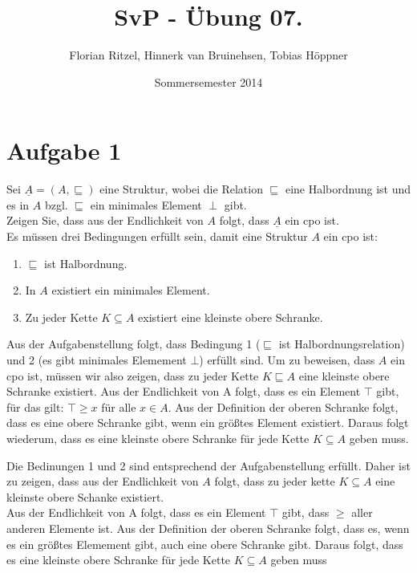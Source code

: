 \documentclass[ngerman,a4paper]{report}
\author{Florian Ritzel, Hinnerk van Bruinehsen, Tobias Höppner}
\title{SvP - Übung 07. }
\date{Sommersemester 2014}
\renewcommand{\maketitle}{}
\begin{document}
\maketitle
\section*{Aufgabe 1}
Sei $\underline{A} = (A,\sqsubseteq)$ eine Struktur, wobei die Relation $\sqsubseteq$ eine Halbordnung ist und es in $A$ bzgl. $\sqsubseteq$ ein minimales Element $\perp$ gibt.\\
Zeigen Sie, dass aus der Endlichkeit von $A$ folgt, dass $\underline{A}$ ein cpo ist.\\

Es müssen drei Bedingungen erfüllt sein, damit eine Struktur $A$ ein cpo ist:
\begin{enumerate}
\item $\sqsubseteq$ ist Halbordnung.
\item In $A$ existiert ein minimales Element.
\item Zu jeder Kette $K\subseteq A$ existiert eine kleinste obere Schranke.
\end{enumerate}
Aus der Aufgabenstellung folgt, dass Bedingung 1 ($\sqsubseteq$ ist Halbordnungsrelation) und 2 (es gibt minimales Elemement $\bot$) erfüllt sind.
Um zu beweisen, dass $A$ ein cpo ist, müssen wir also zeigen, dass zu jeder Kette $K\sqsubseteq A$ eine kleinste obere Schranke existiert.
Aus der Endlichkeit von A folgt, dass es ein Element $\top$ gibt, für das gilt: $\top \geq x$ für alle $x \in A$. Aus der Definition der oberen Schranke folgt, dass es eine obere Schranke gibt, wenn ein größtes Element existiert. Daraus folgt wiederum, dass es eine kleinste obere Schranke für jede Kette $K\subseteq A$ geben muss.

Die Bedinungen 1 und 2 sind entsprechend der Aufgabenstellung erfüllt. Daher ist zu zeigen, dass aus der Endlichkeit von $A$ folgt, dass zu jeder kette $K\subseteq A$ eine kleinste obere Schanke existiert.\\

Aus der Endlichkeit von A folgt, dass es ein Element $\top$ gibt, dass $\geq$ aller anderen Elemente ist. Aus der Definition der oberen Schranke folgt, dass es, wenn es ein größtes Elemement gibt, auch eine obere Schranke gibt. Daraus folgt, dass es eine kleinste obere Schranke für jede Kette $K\subseteq A$ geben muss
\end{document}
